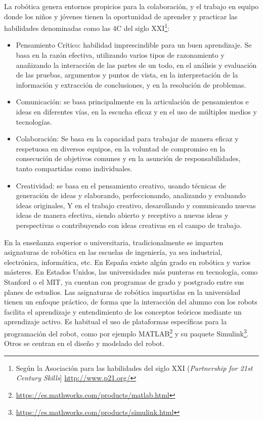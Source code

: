 La robótica genera entornos propicios para la colaboración, y el trabajo en equipo donde los niños y jóvenes tienen la oportunidad de aprender y practicar las habilidades  denominadas como las 4C del siglo XXI\footnote{Según la Asociación para las habilidades del siglo XXI (\textit{Partnership for 21st Century Skills}] \url{http://www.p21.org/}}:
\begin{itemize}
	\item Pensamiento Crítico: habilidad imprescindible para un buen aprendizaje. Se basa en la razón efectiva, utilizando varios tipos de razonamiento y anañizando la interacción de las partes de un todo, en el análisis y evaluación de las pruebas, argumentos y puntos de vista, en la interpretación de la información y extracción de conclusiones, y en la resolución de problemas.
	\item Comunicación: se basa principalmente en la articulación de pensamientos e ideas en diferentes vías, en la escucha eficaz y en el uso de múltiples medios y tecnologías.
	\item Colaboración: Se basa en la capacidad para trabajar de manera eficaz y respetuosa en diversos equipos, en la voluntad de compromiso en la consecución de objetivos comunes y en la asunción de responsabilidades, tanto compartidas como individuales.
	\item Creatividad: se basa en el pensamiento creativo, usando técnicas de generación de ideas y elaborando, perfeccionando, analizando y evaluando ideas originales, Y en el trabajo creativo, desarollando y comunicando nuevas ideas de manera efectiva, siendo abierto y receptivo a nuevas ideas y perspectivas o contribuyendo con ideas creativas en el campo de trabajo.
\end{itemize}

En la enseñanza superior o universitaria, tradicionalmente se imparten asignaturas de robótica en las escuelas de ingeniería, ya sea industrial, electrónica, informática, etc. En España existe algún grado en robótica y varios másteres. En Estados Unidos, las universidades más punteras en tecnología, como Stanford o el MIT, ya cuentan con programas de grado y postgrado entre sus planes de estudios. Las asignaturas de robótica impartidas en la universidad tienen un enfoque práctico, de forma que la interacción del alumno con los robots facilita el aprendizaje y entendimiento de los conceptos teóricos mediante un aprendizaje activo. Es habitual el uso de plataformas específicas para la programación del robot, como por ejemplo MATLAB\footnote{\url{https://es.mathworks.com/products/matlab.html}} y su paquete Simulink\footnote{\url{https://es.mathworks.com/products/simulink.html}}. Otros se centran en el diseño y modelado del robot.

